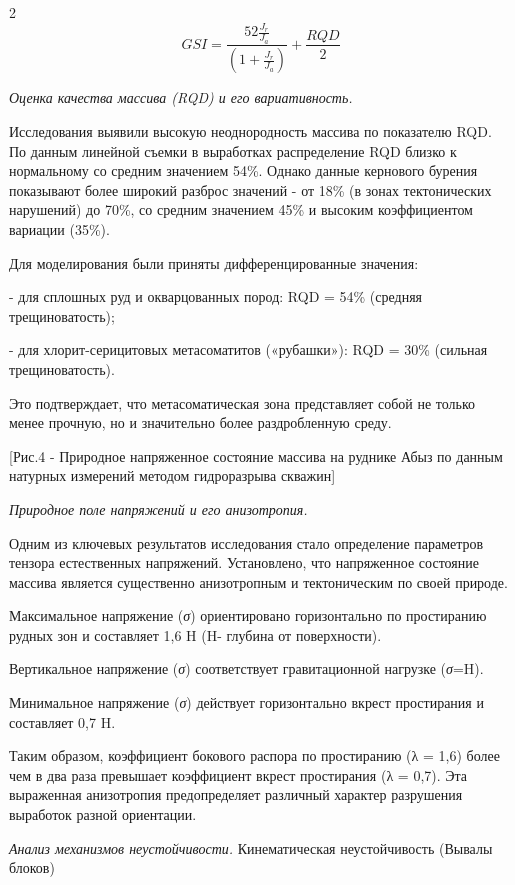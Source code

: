 \begin{multicols}{2}
\[GSI = \frac{52\frac{J_{r}}{J_{a}}}{(1 + \frac{J_{r}}{J_{a}})} + \frac{RQD}{2}\]

\emph{Оценка качества массива (RQD) и его вариативность.}

Исследования выявили высокую неоднородность массива по показателю RQD.
По данным линейной съемки в выработках распределение RQD близко к
нормальному со средним значением 54\%. Однако данные кернового бурения
показывают более широкий разброс значений - от 18\% (в зонах
тектонических нарушений) до 70\%, со средним значением 45\% и высоким
коэффициентом вариации (35\%).

Для моделирования были приняты дифференцированные значения:

- для сплошных руд и окварцованных пород: RQD = 54\% (средняя
трещиноватость);

- для хлорит-серицитовых метасоматитов («рубашки»): RQD = 30\% (сильная
трещиноватость).

Это подтверждает, что метасоматическая зона представляет собой не только
менее прочную, но и значительно более раздробленную среду.

[Рис.4 - Природное напряженное состояние массива на руднике Абыз
по данным натурных измерений методом гидроразрыва скважин]

\emph{Природное поле напряжений и его анизотропия.}

Одним из ключевых результатов исследования стало определение параметров
тензора естественных напряжений. Установлено, что напряженное состояние
массива является существенно анизотропным и тектоническим по своей
природе.

Максимальное напряжение (\emph{σ}) ориентировано
горизонтально по простиранию рудных зон и составляет 1,6 H (H- глубина
от поверхности).

Вертикальное напряжение (\emph{σ}) соответствует
гравитационной нагрузке (\emph{σ}=H).

Минимальное напряжение (\emph{σ}) действует
горизонтально вкрест простирания и составляет 0,7 H.

Таким образом, коэффициент бокового распора по простиранию
(λ = 1,6) более чем в два раза превышает коэффициент
вкрест простирания (λ = 0,7). Эта выраженная
анизотропия предопределяет различный характер разрушения выработок
разной ориентации.

\emph{Анализ механизмов неустойчивости.} Кинематическая неустойчивость
(Вывалы блоков)


\end{multicols}
